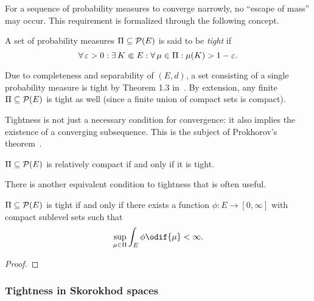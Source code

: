 For a sequence of probability measures to converge narrowly, no \enquote{escape of mass} may occur.
This requirement is formalized through the following concept.

\begin{definition}
  A set of probability measures \(\Pi \subseteq \mathcal{P}(E)\) is said to be \textit{tight} if
  \begin{equation}
    \forall \eps > 0 : \exists K \Subset E : \forall \mu \in \Pi : \mu(K) > 1 - \eps.
  \end{equation}
\end{definition}

Due to completeness and separability of \((E,d)\), a set consisting of a single probability measure is tight by Theorem 1.3 in~\cite{billingsleyConvergenceProbabilityMeasures1999}.
By extension, any finite \(\Pi \subseteq \mathcal{P}(E)\) is tight as well (since a finite union of compact sets is compact).

Tightness is not just a necessary condition for convergence: it also implies the existence of a converging subsequence.
This is the subject of Prokhorov's theorem~\cite[57-65]{billingsleyConvergenceProbabilityMeasures1999}.

\begin{theorem}[Prokhorov]\label{thm:prokhorov}
  \( \Pi \subseteq \mathcal{P}(E) \) is relatively compact if and only if it is tight.
\end{theorem}

There is another equivalent condition to tightness that is often useful.

\begin{lemma}\label{lem:tightness-char-coercive-function}
  \( \Pi \subseteq \mathcal{P}(E) \) is tight if and only if there exists a function \( \phi : E \to [0,\infty] \) with compact sublevel sets such that
  \begin{equation}
    \sup_{\mu \in \Pi} \int_E \phi \odif{\mu} < \infty.
  \end{equation}
\end{lemma}

\begin{proof}
\end{proof}

\subsubsection{Tightness in Skorokhod spaces}

